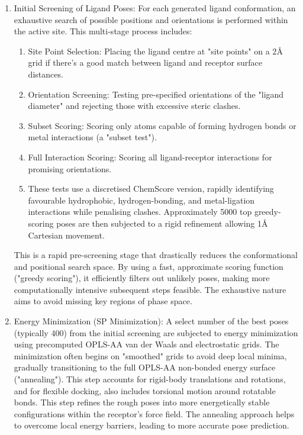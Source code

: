 \documentclass[11pt]{article}
\begin{document}
\begin{enumerate}
     \item Initial Screening of Ligand Poses: For each generated ligand conformation, an exhaustive search of possible positions and orientations is performed within the active site. This multi-stage process includes: 
     \begin{enumerate}
     \item Site Point Selection: Placing the ligand centre at "site points" on a 2{\AA} grid if there's a good match between ligand and receptor surface distances.
     \item Orientation Screening: Testing pre-specified orientations of the "ligand diameter" and rejecting those with excessive steric clashes.
     \item Subset Scoring: Scoring only atoms capable of forming hydrogen bonds or metal interactions (a "subset test").
     \item Full Interaction Scoring: Scoring all ligand-receptor interactions for promising orientations.
     \item These tests use a discretised ChemScore version, rapidly identifying favourable hydrophobic, hydrogen-bonding, and metal-ligation interactions while penalising clashes. Approximately 5000 top greedy-scoring poses are then subjected to a rigid refinement allowing 1{\AA} Cartesian movement.
    \end{enumerate}
    This is a rapid pre-screening stage that drastically reduces the conformational and positional search space. By using a fast, approximate scoring function ("greedy scoring"), it efficiently filters out unlikely poses, making more computationally intensive subsequent steps feasible. The exhaustive nature aims to avoid missing key regions of phase space.
    
    \item Energy Minimization (SP Minimization): A select number of the best poses (typically 400) from the initial screening are subjected to energy minimization using precomputed OPLS-AA van der Waals and electrostatic grids. The minimization often begins on "smoothed" grids to avoid deep local minima, gradually transitioning to the full OPLS-AA non-bonded energy surface ("annealing"). This step accounts for rigid-body translations and rotations, and for flexible docking, also includes torsional motion around rotatable bonds. This step refines the rough poses into more energetically stable configurations within the receptor's force field. The annealing approach helps to overcome local energy barriers, leading to more accurate pose prediction.
    

\end{enumerate}
\end{document}
